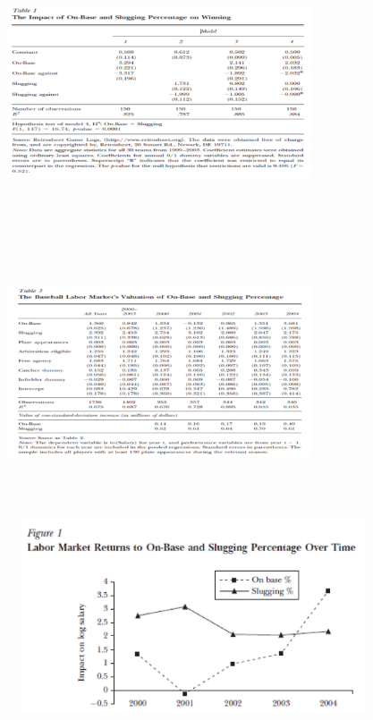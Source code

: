 \documentclass[dvipdfmx,12pt]{beamer}
\begin{document}
\begin{frame}

\begin{center}

\includegraphics[width=9cm,height=7.75cm]{Hakes_Sauer_T1.pdf}

\end{center}

\end{frame}

\begin{frame}

\begin{center}

\includegraphics[width=9cm,height=7.75cm]{Hakes_Sauer_T3.pdf}

\end{center}

\end{frame}

\begin{frame}

\includegraphics[width=11cm,height=5.75cm]{Hakes_Sauer_F1.pdf}

\end{frame}
\end{document}
